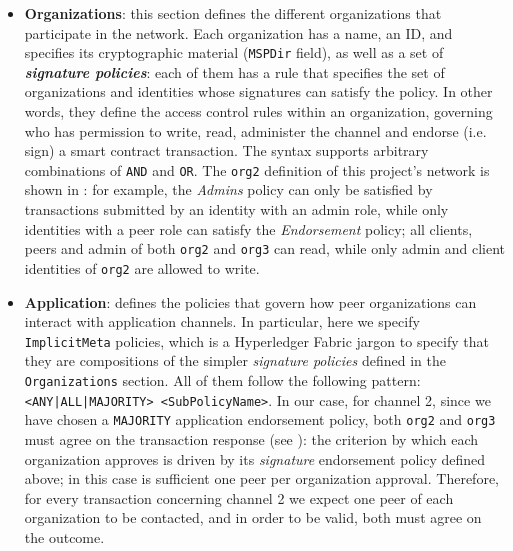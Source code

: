 \documentclass{scrartcl}
\begin{document}
\begin{itemize}
    \item \textbf{Organizations}: this section defines the different organizations that participate in the network. Each organization has a name, an ID, and specifies its cryptographic material (\texttt{MSPDir} field), as well as a set of \textbf{\textit{signature policies}}: each of them has a rule that specifies the set of organizations and identities whose signatures can satisfy the policy. In other words, they define the access control rules within an organization, governing who has permission to write, read, administer the channel and endorse (i.e. sign) a smart contract transaction. The syntax supports arbitrary combinations of \texttt{AND} and \texttt{OR}. The \texttt{org2} definition of this project's network is shown in : for example, the \textit{Admins} policy can only be satisfied by transactions submitted by an identity with an admin role, while only identities with a peer role can satisfy the \textit{Endorsement} policy; all clients, peers and admin of both \texttt{org2} and \texttt{org3} can read, while only admin and client identities of \texttt{org2} are allowed to write.
    

    \item \textbf{Application}: defines the policies that govern how peer organizations can interact with application channels. In particular, here we specify \texttt{ImplicitMeta} policies, which is a Hyperledger Fabric jargon to specify that they are compositions of the simpler \textit{signature policies} defined in the \texttt{Organizations} section. All of them follow the following pattern: \texttt{<ANY|ALL|MAJORITY> <SubPolicyName>}. In our case, for channel 2, since we have chosen a \texttt{MAJORITY} application endorsement policy, both \texttt{org2} and \texttt{org3} must agree on the transaction response (see ): the criterion by which each organization approves is driven by its \textit{signature} endorsement policy defined above; in this case is sufficient one peer per organization approval. Therefore, for every transaction concerning channel 2 we expect one peer of each organization to be contacted, and in order to be valid, both must agree on the outcome.
    


\end{itemize}
\end{document}
